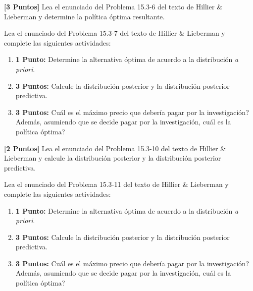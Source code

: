 \documentclass[ a4paper, twoside, 11pt]{article}
\begin{document}
\begin{problem}
\label{prob:H&L_P15_3_6}
\textbf{[3 Puntos]} Lea el enunciado del Problema 15.3-6 del texto de Hillier \& Lieberman y determine la pol\'itica \'optima resultante. 

\end{problem}
\fullskip

\begin{problem}
\label{prob:H&L_P15_3_7} Lea el enunciado del Problema 15.3-7 del texto de Hillier \& Lieberman y complete las siguientes actividades: 
\begin{enumerate}[label=\textbf{\alph*)}]
\item \textbf{1 Punto:} Determine la alternativa \'optima de acuerdo a la distribuci\'on \emph{a priori}. 
\item \textbf{3 Puntos:} Calcule la distribuci\'on posterior y la distribuci\'on posterior predictiva. 
\item \textbf{3 Puntos:} Cu\'al es el m\'aximo precio que deber\'ia pagar por la investigaci\'on? Adem\'as, asumiendo que se decide pagar por la investigaci\'on, cu\'al es la pol\'itica \'optima?  
\end{enumerate}

\end{problem}
\fullskip

\begin{problem}
\label{prob:H&L_P15_3_10}
\textbf{[2 Puntos]} Lea el enunciado del Problema 15.3-10 del texto de Hillier \& Lieberman y calcule la distribuci\'on posterior y la distribuci\'on posterior predictiva. 

\end{problem}
\fullskip

\begin{problem}
\label{prob:H&L_P15_3_11} Lea el enunciado del Problema 15.3-11 del texto de Hillier \& Lieberman y complete las siguientes actividades: 
\begin{enumerate}[label=\textbf{\alph*)}]
\item \textbf{1 Punto:} Determine la alternativa \'optima de acuerdo a la distribuci\'on \emph{a priori}. 
\item \textbf{3 Puntos:} Calcule la distribuci\'on posterior y la distribuci\'on posterior predictiva. 
\item \textbf{3 Puntos:} Cu\'al es el m\'aximo precio que deber\'ia pagar por la investigaci\'on? Adem\'as, asumiendo que se decide pagar por la investigaci\'on, cu\'al es la pol\'itica \'optima?  
\end{enumerate}

\end{problem}
\fullskip
\end{document}
